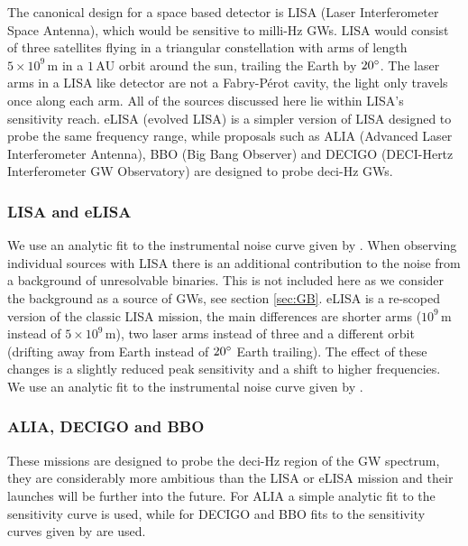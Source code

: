 The canonical design for a space based detector is LISA (Laser Interferometer Space Antenna), which would be sensitive to milli-Hz GWs. LISA would consist of three satellites flying in a triangular constellation with arms of length $5\times 10^{9}\,\textrm{m}$ in a $1\,\textrm{AU}$ orbit around the sun, trailing the Earth by $20^\circ$. The laser arms in a LISA like detector are not a Fabry-P\'{e}rot cavity, the light only travels once along each arm. All of the sources discussed here lie within LISA's sensitivity reach. eLISA (evolved LISA) is a simpler version of LISA designed to probe the same frequency range, while proposals such as ALIA (Advanced Laser Interferometer Antenna), BBO (Big Bang Observer) and DECIGO (DECI-Hertz Interferometer GW Observatory) are designed to probe deci-Hz GWs.

\subsubsection{LISA and eLISA}
We use an analytic fit to the instrumental noise curve given by \cite{Sathyaprakash}. When observing individual sources with LISA there is an additional contribution to the noise from a background of unresolvable binaries. This is not included here as we consider the background as a source of GWs, see section \ref{sec:GB}. eLISA is a re-scoped version of the classic LISA mission, the main differences are shorter arms ($10^{9}\,\textrm{m}$ instead of $5\times 10^{9}\,\textrm{m}$), two laser arms instead of three and a different orbit (drifting away from Earth instead of $20^\circ$ Earth trailing). The effect of these changes is a slightly reduced peak sensitivity and a shift to higher frequencies. We use an analytic fit to the instrumental noise curve given by \cite{Amaro-Seoane-et-al}.

\subsubsection{ALIA, DECIGO and BBO}
These missions are designed to probe the deci-Hz region of the GW spectrum, they are considerably more ambitious than the LISA or eLISA mission and their launches will be further into the future. For ALIA a simple analytic fit to the sensitivity curve is used, while for DECIGO and BBO fits to the sensitivity curves given by \cite{2011PhRvD..83d4011Y} are used.



